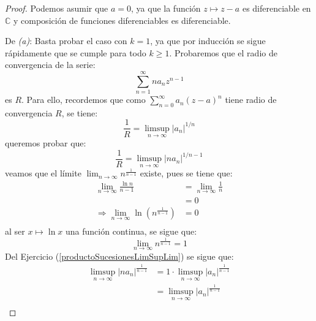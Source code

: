 \documentclass[12pt]{report}
\newcounter{it}
\theoremstyle{largebreak}
\newcommand\abs[1]{\ensuremath{\left|#1\right|}}
\begin{document}
    \begin{proof}
        Podemos asumir que $a=0$, ya que la función $z\mapsto z-a$ es diferenciable en $\mathbb{C}$ y composición de funciones diferenciables es diferenciable.

        De \textit{(a)}: Basta probar el caso con $k=1$, ya que por inducción se sigue rápidamente que se cumple para todo $k\geq1$. Probaremos que el radio de convergencia de la serie:
        \begin{equation*}
            \sum_{ n=1}^\infty na_nz^{ n-1}
        \end{equation*}
        es $R$. Para ello, recordemos que como $\sum_{ n=0}^\infty a_n(z-a)^n$ tiene radio de convergencia $R$, se tiene:
        \begin{equation*}
            \frac{1}{R}=\limsup_{ n\rightarrow\infty}\abs{a_n}^{ 1/n}
        \end{equation*}
        queremos probar que:
        \begin{equation*}
            \frac{1}{R}=\limsup_{ n\rightarrow\infty}\abs{na_n}^{ 1/{n-1}}
        \end{equation*}
        veamos que el límite $\lim_{n\rightarrow\infty}n^{\frac{1}{n-1}}$ existe, pues se tiene que:
        \begin{equation*}
            \begin{split}
                \lim_{ n\rightarrow\infty}\frac{\ln n}{n-1}&=\lim_{ n\rightarrow\infty}\frac{1}{n}\\
                &=0\\
                \Rightarrow\lim_{ n\rightarrow\infty}\ln\left(n^{\frac{1}{n-1}} \right)&=0\\
            \end{split}
        \end{equation*}
        al ser $x\mapsto \ln x$ una función continua, se sigue que:
        \begin{equation*}
            \lim_{ n\rightarrow\infty}n^{\frac{1}{n-1}}=1
        \end{equation*}
        Del Ejercicio (\ref{productoSucesionesLimSupLim}) se sigue que:
        \begin{equation*}
            \begin{split}
                \limsup_{ n\rightarrow\infty}\abs{na_n}^{\frac{1}{n-1}}&=1\cdot\limsup_{ n\rightarrow\infty}\abs{a_n}^{\frac{1}{n-1}}\\
                &=\limsup_{ n\rightarrow\infty}\abs{a_n}^{\frac{1}{n-1}}\\

\end{split}
\end{equation*}
\end{proof}
\end{document}
